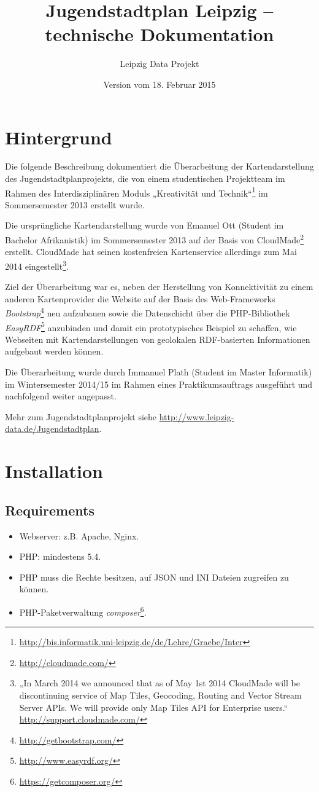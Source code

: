 \documentclass[11pt,a4paper]{article}
\title{Jugendstadtplan Leipzig -- technische Dokumentation}
\author{Leipzig Data Projekt}
\date{Version vom 18. Februar 2015}
\begin{document}
\maketitle

\section{Hintergrund}

Die folgende Beschreibung dokumentiert die Überarbeitung der Kartendarstellung
des Jugendstadtplanprojekts, die von einem studentischen Projektteam im Rahmen
des Interdisziplinären Moduls „Kreativität und
Technik“\footnote{\url{http://bis.informatik.uni-leipzig.de/de/Lehre/Graebe/Inter}}
im Sommersemester 2013 erstellt wurde. 

Die ursprüngliche Kartendarstellung wurde von Emanuel Ott (Student im Bachelor
Afrikanistik) im Sommersemester 2013 auf der Basis von
CloudMade\footnote{\url{http://cloudmade.com/}} erstellt.  CloudMade hat seinen
kostenfreien Kartenservice allerdings zum Mai 2014 eingestellt\footnote{„In
  March 2014 we announced that as of May 1st 2014 CloudMade will be
  discontinuing service of Map Tiles, Geocoding, Routing and Vector Stream
  Server APIs. We will provide only Map Tiles API for Enterprise users.“
  \url{http://support.cloudmade.com/}}.

Ziel der Überarbeitung war es, neben der Herstellung von Konnektivität zu einem
anderen Kartenprovider die Website auf der Basis des Web-Frameworks
\emph{Bootstrap}\footnote{\url{http://getbootstrap.com/}} neu aufzubauen sowie
die Datenschicht über die PHP-Bibliothek
\emph{EasyRDF}\footnote{\url{http://www.easyrdf.org/}} anzubinden und damit ein
prototypisches Beispiel zu schaffen, wie Webseiten mit Kartendarstellungen von
geolokalen RDF-basierten Informationen aufgebaut werden können.

Die Überarbeitung wurde durch Immanuel Plath (Student im Master Informatik) im
Wintersemester 2014/15 im Rahmen eines Praktikumsauftrags ausgeführt und
nachfolgend weiter angepasst.

Mehr zum Jugendstadtplanprojekt siehe
\url{http://www.leipzig-data.de/Jugendstadtplan}. 

\section{Installation}

\subsection{Requirements}
\begin{itemize}\itemsep0pt
\item Webserver: z.B. Apache, Nginx.
\item PHP: mindestens 5.4.
\item PHP muss die Rechte besitzen, auf JSON und INI Dateien zugreifen zu
  können.
\item PHP-Paketverwaltung
  \emph{composer}\footnote{\url{https://getcomposer.org/}}.
\end{itemize}
\end{document}
